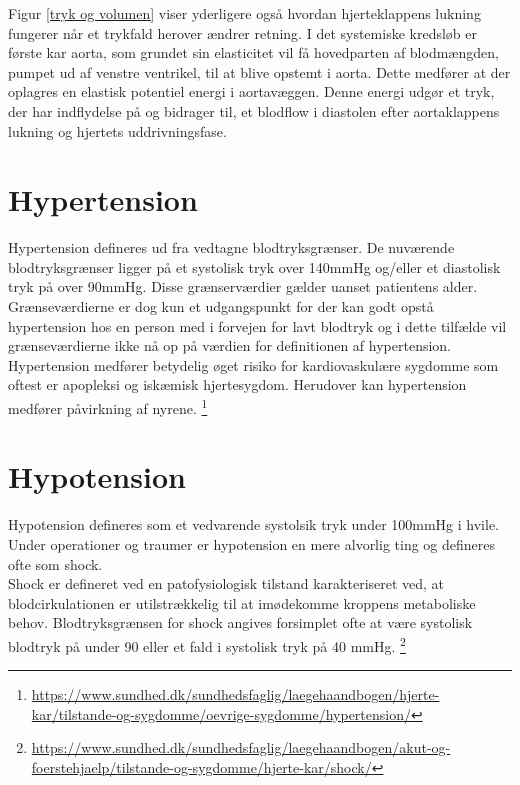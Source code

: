 Figur \ref{tryk og volumen} viser yderligere også hvordan hjerteklappens lukning fungerer når et trykfald herover ændrer retning. I det systemiske kredsløb er første kar aorta, som grundet sin elasticitet vil få hovedparten af blodmængden, pumpet ud af venstre ventrikel, til at blive opstemt i aorta. Dette medfører at der oplagres en elastisk potentiel energi i aortavæggen. Denne energi udgør et tryk, der har indflydelse på og bidrager til, et blodflow i diastolen efter aortaklappens lukning og hjertets uddrivningsfase. 

\section{Hypertension}
Hypertension defineres ud fra vedtagne blodtryksgrænser. De nuværende blodtryksgrænser ligger på et systolisk tryk over 140mmHg og/eller et diastolisk tryk på over 90mmHg. Disse grænserværdier gælder uanset patientens alder. Grænseværdierne er dog kun et udgangspunkt for der kan godt opstå hypertension hos en person med i forvejen for lavt blodtryk og i dette tilfælde vil grænseværdierne ikke nå op på værdien for definitionen af hypertension.\\
Hypertension medfører betydelig øget risiko for kardiovaskulære sygdomme som oftest er apopleksi og iskæmisk hjertesygdom. Herudover kan hypertension medfører påvirkning af nyrene.
\footnote{\url{https://www.sundhed.dk/sundhedsfaglig/laegehaandbogen/hjerte-kar/tilstande-og-sygdomme/oevrige-sygdomme/hypertension/}} 

\section{Hypotension}
Hypotension defineres som et vedvarende systolsik tryk under 100mmHg i hvile. \\
Under operationer og traumer er hypotension en mere alvorlig ting og defineres ofte som shock.\\
Shock er defineret ved en patofysiologisk tilstand karakteriseret ved, at blodcirkulationen er utilstrækkelig til at imødekomme kroppens metaboliske behov. Blodtryksgrænsen for shock angives forsimplet ofte at være systolisk blodtryk på under 90 eller et fald i systolisk tryk på 40 mmHg.
\footnote{\url{https://www.sundhed.dk/sundhedsfaglig/laegehaandbogen/akut-og-foerstehjaelp/tilstande-og-sygdomme/hjerte-kar/shock/}}

